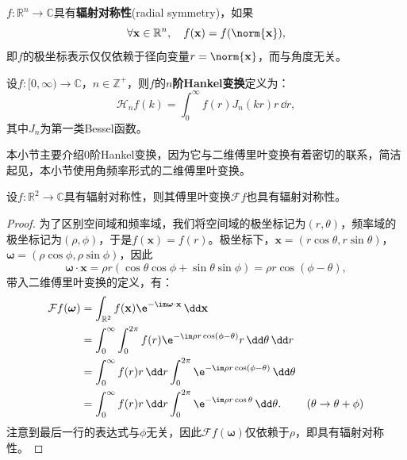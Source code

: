 \begin{definition}[辐射对称性]
    $f:\mathbb{R}^n\to\mathbb{C}$具有\textbf{辐射对称性}(radial symmetry)，如果
    \begin{equation}
        \forall\mathbf{x}\in\mathbb{R}^n,\quad f(\mathbf{x})=f(\norm{\mathbf{x}}),
    \end{equation}
    即$f$的极坐标表示仅仅依赖于径向变量$r=\norm{\mathbf{x}}$，而与角度无关。
\end{definition}

\begin{definition}[Hankel变换]
    设$f:[0,\infty)\to\mathbb{C}$，$n\in\mathbb{Z}^+$，则$f$的\textbf{$n$阶Hankel变换}定义为：
    \begin{equation}
        \mathcal{H}_n f(k)=\int_0^{\infty}f(r)J_n(kr)r\,\dd r,
    \end{equation}
    其中$J_n$为第一类Bessel函数。
\end{definition}

本小节主要介绍$0$阶Hankel变换，因为它与二维傅里叶变换有着密切的联系，简洁起见，本小节使用角频率形式的二维傅里叶变换。

\begin{lemma}
    设$f:\mathbb{R}^2\to\mathbb{C}$具有辐射对称性，则其傅里叶变换$\mathcal{F}f$也具有辐射对称性。
\end{lemma}
\begin{proof}
    为了区别空间域和频率域，我们将空间域的极坐标记为$(r,\theta)$，频率域的极坐标记为$(\rho,\phi)$，于是$f(\mathbf{x})=f(r)$。极坐标下，$\mathbf{x}=(r\cos\theta,r\sin\theta)$，$\boldsymbol{\omega}=(\rho\cos\phi,\rho\sin\phi)$，因此
    \begin{equation}
        \boldsymbol{\omega}\cdot\mathbf{x}=\rho r(\cos\theta\cos\phi+\sin\theta\sin\phi)=\rho r\cos(\phi-\theta),
    \end{equation}
    带入二维傅里叶变换的定义，有：
    \begin{align}
        \mathcal{F}f(\boldsymbol{\omega})&=\int_{\mathbb{R}^2}f(\mathbf{x})\e^{-\im\boldsymbol{\omega}\cdot\mathbf{x}}\,\dd\mathbf{x}\nonumber\\
        &=\int_0^{\infty}\int_0^{2\pi}f(r)\e^{-\im\rho r\cos(\phi-\theta)}r\,\dd\theta\,\dd r\nonumber\\
        &=\int_0^{\infty}f(r)r\,\dd r\int_0^{2\pi}\e^{-\im\rho r\cos(\phi-\theta)}\,\dd\theta\nonumber\\
        &=\int_0^{\infty}f(r)r\,\dd r\int_0^{2\pi}\e^{-\im\rho r\cos\theta}\,\dd\theta.&(\theta\to\theta+\phi)
    \end{align}
    注意到最后一行的表达式与$\phi$无关，因此$\mathcal{F}f(\boldsymbol{\omega})$仅依赖于$\rho$，即具有辐射对称性。
\end{proof}

